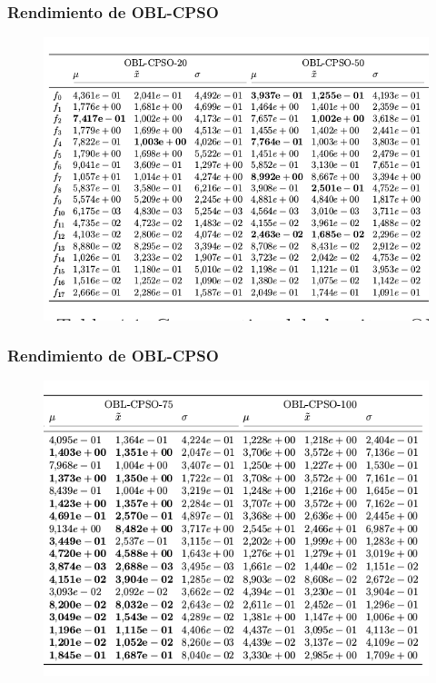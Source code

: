 \begin{frame}
\frametitle{Rendimiento de OBL-CPSO}
\begin{figure}
  \centering
	\includegraphics[scale=0.5]{img/oblcpso1}
\end{figure}
\end{frame}

\begin{frame}
\frametitle{Rendimiento de OBL-CPSO}
\begin{figure}
  \centering
	\includegraphics[scale=0.5]{img/oblcpso2}
\end{figure}
\end{frame}

